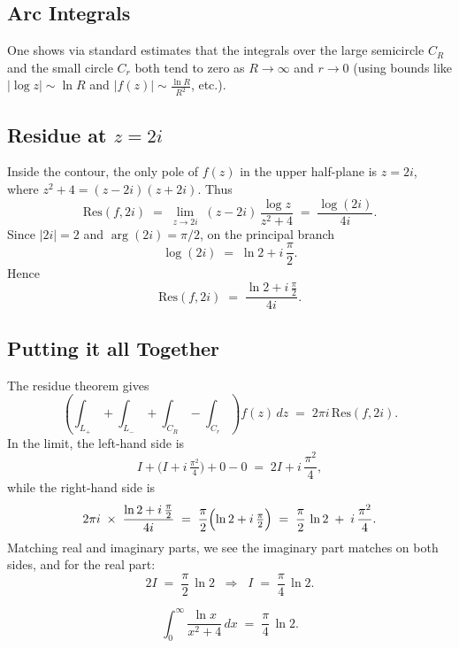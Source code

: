 \documentclass[12pt]{article}
\theoremstyle{definition} %
\theoremstyle{plain} %
\begin{document}
\subsection*{Arc Integrals}

One shows via standard estimates that the integrals over the large semicircle $C_R$ and the small circle $C_r$ both tend to zero as $R\to\infty$ and $r\to0$ (using bounds like $|\log z| \sim \ln R$ and $|f(z)| \sim \frac{\ln R}{R^2}$, etc.).

\subsection*{Residue at $z=2i$}

Inside the contour, the only pole of $f(z)$ in the upper half-plane is $z=2i$, where $z^2+4 = (z-2i)(z+2i)$. Thus
\[
\mathrm{Res}(f,2i)
\;=\;\lim_{z\to 2i} \;(z-2i)\,\frac{\log z}{z^2 + 4}
\;=\;\frac{\log(2i)}{4i}.
\]
Since $|2i|=2$ and $\arg(2i)=\pi/2$, on the principal branch
\[
\log(2i) \;=\;\ln 2 + i\,\frac{\pi}{2}.
\]
Hence
\[
\mathrm{Res}(f,2i)
\;=\;\frac{\ln 2 + i\,\frac{\pi}{2}}{4i}.
\]

\subsection*{Putting it all Together}

The residue theorem gives
\[
\left(\int_{L_{+}} + \int_{L_{-}} + \int_{C_R} - \int_{C_r}\right) f(z)\,dz
\;=\;
2\pi i \,\mathrm{Res}(f,2i).
\]
In the limit, the left-hand side is
\[
I + \bigl(I + i\,\tfrac{\pi^2}{4}\bigr) + 0 - 0
\;=\;
2I + i\,\frac{\pi^2}{4},
\]
while the right-hand side is
\[
2\pi i 
\;\times\;
\frac{\ln 2 + i\,\tfrac{\pi}{2}}{4i}
\;=\;
\frac{\pi}{2} \Bigl(\ln 2 + i\,\tfrac{\pi}{2}\Bigr)
\;=\;
\frac{\pi}{2}\,\ln 2 
\;+\; 
i\,\frac{\pi^2}{4}.
\]
Matching real and imaginary parts, we see the imaginary part matches on both sides, and for the real part:
\[
2I \;=\; \frac{\pi}{2}\,\ln 2
\;\;\Longrightarrow\;\;
I \;=\; \frac{\pi}{4}\,\ln 2.
\]

\[
\boxed{
\int_{0}^{\infty} \frac{\ln x}{x^2 + 4}\,dx
\;=\;
\frac{\pi}{4}\,\ln 2.
}
\]
\end{document}
